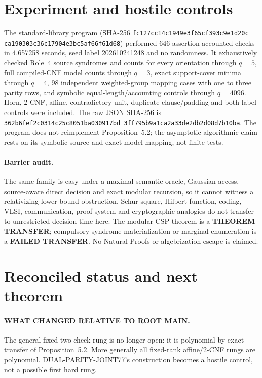 \documentclass[11pt]{article}
\begin{document}
\section{Experiment and hostile controls}
\begin{sloppypar}
The standard-library program
(SHA-256 \texttt{fc127cc14c1949e3\allowbreak f65cf393c9e1d20c\allowbreak
ca190303c36c1790\allowbreak 4e3bc5af66f61d68})
performed 646 assertion-accounted checks in 4.657258 seconds, seed label
202610241248 and no randomness.  It exhaustively checked Role~4 source
syndromes and counts for every orientation through $q=5$, full compiled-CNF
model counts through $q=3$, exact support-cover minima through $q=4$, 98
independent weighted-group mapping cases with one to three parity rows, and
symbolic equal-length/accounting controls through $q=4096$.  Horn, 2-CNF,
affine, contradictory-unit, duplicate-clause/padding and both-label controls
were included.  The raw JSON SHA-256 is
\texttt{362b6fef2c0314c2\allowbreak 5c8051ba030917bd\allowbreak
3ff795b9a1ca2a33\allowbreak de2db2d08d7b10ba}.
The program does not reimplement Proposition~5.2; the asymptotic algorithmic
claim rests on its symbolic source and exact model mapping, not finite tests.
\end{sloppypar}

\paragraph{Barrier audit.}
The same family is easy under a maximal semantic oracle, Gaussian access,
source-aware direct decision and exact modular recursion, so it cannot witness
a relativizing lower-bound obstruction.  Schur-square, Hilbert-function,
coding, VLSI, communication, proof-system and cryptographic analogies do not
transfer to unrestricted decision time here.  The modular-CSP theorem is a
\textbf{THEOREM TRANSFER}; compulsory syndrome materialization or marginal
enumeration is a \textbf{FAILED TRANSFER}.  No Natural-Proofs or
algebrization escape is claimed.

\section{Reconciled status and next theorem}
\paragraph{WHAT CHANGED RELATIVE TO ROOT MAIN.}
The general fixed-two-check rung is no longer open: it is polynomial by exact
transfer of Proposition~5.2.  More generally all fixed-rank affine/2-CNF
rungs are polynomial.  DUAL-PARITY-JOINT77's construction becomes a hostile
control, not a possible first hard rung.
\end{document}
